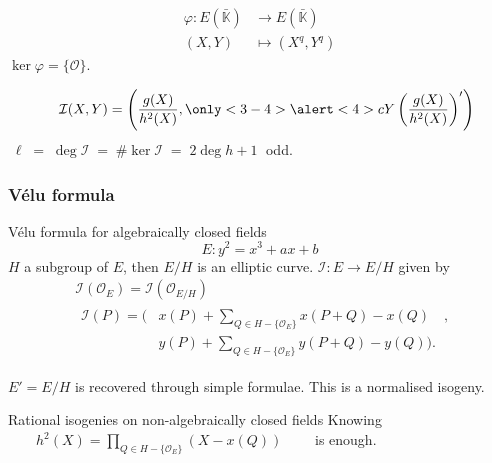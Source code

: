 \documentclass[10pt]{beamer}
\newcommand{\clot}[1]{\bar{#1}}  %
\newcommand{\card}[1]{\# #1}  %
\newcommand{\K}{\mathbb{K}}  %
\newcommand{\frob}{\varphi}  %
\newcommand{\0}{\mathcal{O}}  %
\newcommand{\isog}[1]{\mathcal{#1}}  %
\newcommand{\I}{\isog{I}}  %
\begin{document}
\begin{frame}
\begin{block}
\begin{overprint}
      \[\begin{aligned}
	\frob : E(\clot{\K}) &\rightarrow E(\clot{\K})\\
	               (X,Y) &\mapsto (X^q,Y^q)
      \end{aligned}\]
      $\ker\frob = \{\0\}$.

      \[\quad\I(X,Y) = \left(\frac{g(X)}{h^2(X)},
      \only<3-4>{\alert<4>{c}}Y\left(\frac{g(X)}{h^2(X)}\right)'\right)\]
      $\;\ell\;=\;\deg\I\;=\;
      \card{\ker\I} \;=\; 2\deg h + 1\;$ odd.
    \end{overprint}
  \end{block}
\end{frame}


\begin{frame}
  \frametitle{Vélu formula}
  
  \begin{block}{Vélu formula for algebraically closed fields}
    \[E : y^2 = x^3 + ax + b\]
    $H$ a subgroup of $E$, then $E/H$ is an elliptic curve. $\I:E\rightarrow E/H$ given by
    \begin{align*}
      &\I(\0_E) = \I(\0_{E/H})\\
      &\begin{aligned}
        \I(P) = \Biggl( &x(P) + \sum_{Q\in H - \{\0_E\}}x(P+Q) - x(Q) \quad,\\
        &y(P) + \sum_{Q\in H - \{\0_E\}}y(P+Q) - y(Q) \Biggr) \text{.}
      \end{aligned}
    \end{align*}

    $E'=E/H$ is recovered through simple formulae. This is a
    normalised isogeny.
  \end{block}

  \begin{block}{Rational isogenies on non-algebraically closed fields}
    \centering Knowing $\qquad h^2(X) = \prod_{Q\in H-\{\0_E\}}\left(X
    - x(Q)\right)\qquad$ is enough.
  \end{block}
\end{frame}

\end{document}
